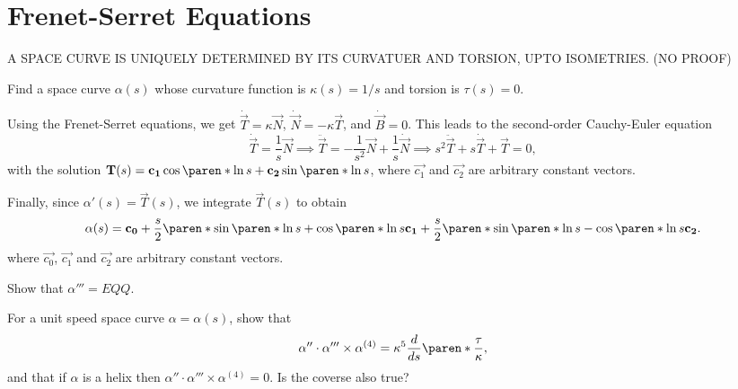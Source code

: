 \documentclass[11pt]{penrose}
\newcommand{\vT}{\vec{T}}
\newcommand{\vN}{\vec{N}}
\newcommand{\vB}{\vec{B}}
\newcommand{\missing}[1]{{\color{red}#1}}
\begin{document}
\section{Frenet-Serret Equations}

\missing{\begin{nthm}
    A SPACE CURVE IS UNIQUELY DETERMINED BY ITS CURVATUER AND TORSION, UPTO ISOMETRIES. (NO PROOF)
\end{nthm}}

\begin{negg}
    Find a space curve $\alpha(s)$ whose curvature function is $\kappa(s) = 1/s$ and torsion is $\tau(s) = 0$.

    Using the Frenet-Serret equations, we get $\dot{\vT} = \kappa \vN$, $\dot{\vN} = - \kappa \vT$, and $\dot{\vB} = 0$. This leads to the second-order Cauchy-Euler equation
    \begin{equation}
        \dot{\vT} = \frac{1}{s} \vN
        \implies
        \ddot{\vT} = -\frac{1}{s^2} \vN + \frac{1}{s} \dot{\vN}
        \implies
        s^2 \ddot{\vT} + s \dot{\vT} + \vT = 0,
    \end{equation}
    with the solution $\vT(s) = \vec{c_1} \cos\paren*{\ln s} + \vec{c_2} \sin\paren*{\ln s}$, where $\vec{c_1}$ and $\vec{c_2}$ are arbitrary constant vectors.

    Finally, since $\alpha'(s) = \vT(s)$, we integrate $\vT(s)$ to obtain
    \begin{equation}
        \alpha(s) = \vec{c_0}
        + \frac{s}{2} \paren*{\sin\paren*{\ln s} + \cos\paren*{\ln s}} \vec{c_1}
        + \frac{s}{2} \paren*{\sin\paren*{\ln s} - \cos\paren*{\ln s}} \vec{c_2}.
    \end{equation}
    where $\vec{c_0}$, $\vec{c_1}$ and $\vec{c_2}$ are arbitrary constant vectors.
\end{negg}

\missing{
\begin{nex}
    Show that $\alpha''' = EQQ$.
\end{nex}
}

\begin{nex}
    For a unit speed space curve $\alpha = \alpha(s)$, show that
    \begin{equation}
        \alpha'' \cdot \alpha''' \times \alpha^{(4)} = \kappa^5 \frac{d}{ds}\paren*{\frac{\tau}{\kappa}},
    \end{equation}
    and that if $\alpha$ is a helix then $\alpha'' \cdot \alpha''' \times \alpha^{(4)} = 0$. Is the coverse also true?
\end{nex}
\end{document}

